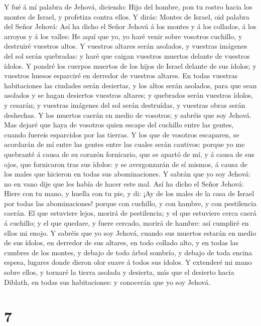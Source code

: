  Y fué á mí palabra de Jehová, diciendo:  Hijo
del hombre, pon tu rostro hacia los montes de Israel, y profetiza contra
ellos.  Y dirás: Montes de Israel, oid palabra del Señor
Jehová: Así ha dicho el Señor Jehová á los montes y á los collados, á
los arroyos y á los valles: He aquí que yo, yo haré venir sobre vosotros
cuchillo, y destruiré vuestros altos.  Y vuestros altares
serán asolados, y vuestras imágenes del sol serán quebradas: y haré que
caigan vuestros muertos delante de vuestros ídolos.  Y
pondré los cuerpos muertos de los hijos de Israel delante de sus ídolos;
y vuestros huesos esparciré en derredor de vuestros altares.
 En todas vuestras habitaciones las ciudades serán
desiertas, y los altos serán asolados, para que sean asolados y se hagan
desiertos vuestros altares; y quebrados serán vuestros ídolos, y
cesarán; y vuestras imágenes del sol serán destruídas, y vuestras obras
serán deshechas.  Y los muertos caerán en medio de vosotros;
y sabréis que soy Jehová.  Mas dejaré que haya de vosotros
quien escape del cuchillo entre las gentes, cuando fuereis esparcidos
por las tierras.  Y los que de vosotros escaparen, se
acordarán de mí entre las gentes entre las cuales serán cautivos: porque
yo me quebranté á causa de su corazón fornicario, que se apartó de mí, y
á causa de sus ojos, que fornicaron tras sus ídolos: y se avergonzarán
de sí mismos, á causa de los males que hicieron en todas sus
abominaciones.  Y sabrán que yo soy Jehová: no en vano dije
que les había de hacer este mal.  Así ha dicho el Señor
Jehová: Hiere con tu mano, y huella con tu pie, y di: ¡Ay de los males
de la casa de Israel por todas las abominaciones! porque con cuchillo, y
con hambre, y con pestilencia caerán.  El que estuviere
lejos, morirá de pestilencia; y el que estuviere cerca caerá á cuchillo;
y el que quedare, y fuere cercado, morirá de hambre: así cumpliré en
ellos mi enojo.  Y sabréis que yo soy Jehová, cuando sus
muertos estarán en medio de sus ídolos, en derredor de sus altares, en
todo collado alto, y en todas las cumbres de los montes, y debajo de
todo árbol sombrío, y debajo de toda encina espesa, lugares donde dieron
olor suave á todos sus ídolos.  Y extenderé mi mano sobre
ellos, y tornaré la tierra asolada y desierta, más que el desierto hacia
Diblath, en todas sus habitaciones: y conocerán que yo soy Jehová.

\hypertarget{section-6}{%
\section{7}\label{section-6}}

